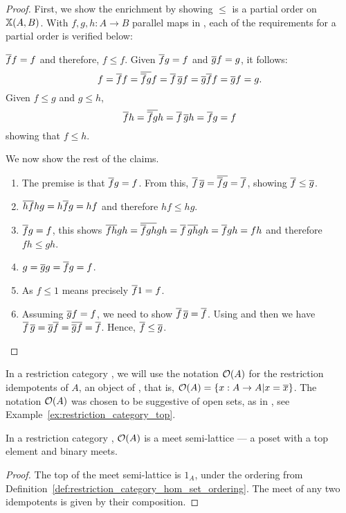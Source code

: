 \begin{proof}
  First, we show the enrichment by showing $\le$ is a partial order on $\mathbb{X}(A,B)$. With
  $f,g,h:A\to  B$ parallel maps in \X, each of the requirements for a partial order is
  verified below:
  \begin{description}
     $\overline{f} f = f$ and therefore, $ f \le f$.
     Given $\overline{f}g = f$ and $\overline{g}f = g$, it follows:
    \[
      f = \overline{f} f = \overline{\overline{f} g} f = \overline{f}\, \overline{g} f
      = \overline{g}\overline{f} f =  \overline{g} f = g.
    \]
     Given $f \le g$ and $g\le h$,
      \[
        \overline{f} h = \overline{\overline{f} g} h = \overline{f}\, \overline{g} h = \overline{f} g = f
      \]
    showing that $f \le h$.
  \end{description}

  We now show the rest of the claims.
  \begin{enumerate}[{(}i{)}]
    \item The premise is that $\overline{f} g = f$. From this, $ \overline{f}\, \overline{g} =
      \overline{\overline{f} g} = \overline{f}$, showing $\overline{f} \le \overline{g}$.
    \item $\overline{h f} h g = h \overline{f} g = h f$  and therefore $h f \le h g$.
    \item $\overline{f} g = f$, this shows $\overline{f h} g h = \overline{\overline{f} g h} g h
      = \overline{f}\, \overline{g h} g h = \overline{f} g h = f h$ and therefore $f h \le g h$.
    \item $g = \overline{g} g = \overline{f} g = f$.
    \item As $f \le 1$ means precisely $\overline{f}1 = f$.
    \item Assuming $\overline{g} f = f$, we need to show $\overline{f}\, \overline{g} = \overline{f}$. Using \rtwo and
      then \rthree we have $\overline{f}\,\overline{g} = \overline{g}\overline{f}  = \overline{\overline{g} f}  = \overline{f}$.
      Hence, $\overline{f} \le \overline{g}$.
  \end{enumerate}
\end{proof}

In a restriction category \X, we will use the notation $\mathcal{O}({A})$ for the restriction idempotents
of $A$, an object of \X, that is, $\mathcal{O}({A}) = \{x:A\to A| x = \overline{x}\}$. The notation $\mathcal{O}({A})$ was chosen
to be suggestive of open sets, as in \topcatp, see Example~\ref{ex:restriction_category_top}.

\begin{lemma}\label{lem:open_a_is_a_meet_semilattice}
  In a restriction category \X, $\mathcal{O}({A})$ is a meet semi-lattice --- a poset with a top element and
  binary meets.
\end{lemma}
\begin{proof}
  The top of the meet semi-lattice is $1_A$, under the ordering from
  Definition~\ref{def:restriction_category_hom_set_ordering}.
  The meet of any two idempotents is given by their composition.
\end{proof}

